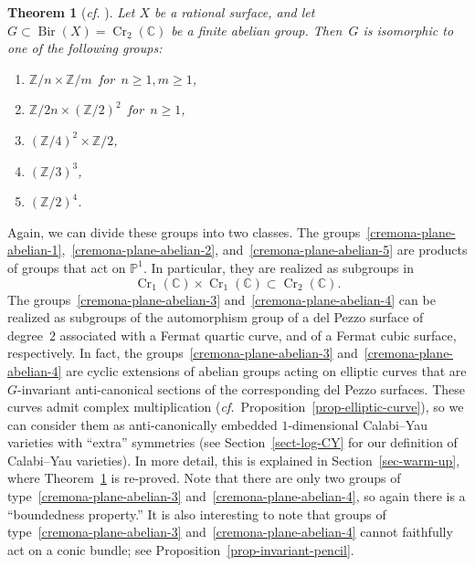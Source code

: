 \documentclass[11pt]{amsart}
\numberwithin{equation}{section}
\newtheorem{thm}{Theorem}[section]
\theoremstyle{definition}
\theoremstyle{remark}
\DeclareMathOperator{\Cr}{Cr}
\DeclareMathOperator{\Bir}{Bir}
\begin{document}
\begin{thm}[\textit{cf.} {\cite{Bl07}}]
\label{thm-surfaces}
Let $X$ be a rational surface, and let $G\subset \Bir(X)=\Cr_2(\mathbb{C})$ be a
finite abelian group. Then~$G$ is isomorphic to one of the following groups:
\begin{enumerate}
\item
\label{cremona-plane-abelian-1}
$\mathbb{Z}/n\times \mathbb{Z}/m$\ for\ $n\geq
1, m\geq 1$,

\item
\label{cremona-plane-abelian-2}
$\mathbb{Z}/2n\times (\mathbb{Z}/2)^2$\ for\ $n\geq 1$,

\item
\label{cremona-plane-abelian-3}
$(\mathbb{Z}/4)^2\times \mathbb{Z}/2$,

\item
\label{cremona-plane-abelian-4}
$(\mathbb{Z}/3)^3$,

\item
\label{cremona-plane-abelian-5}
$(\mathbb{Z}/2)^4$.
\end{enumerate}
\end{thm}

Again, we can divide these groups into two classes. 
The groups~\eqref{cremona-plane-abelian-1},~\eqref{cremona-plane-abelian-2}, and~\eqref{cremona-plane-abelian-5} are products of groups that act on $\mathbb{P}^1$. In particular, they are realized as subgroups in
\[
\Cr_1(\mathbb{C})\times\Cr_1(\mathbb{C})\subset
\Cr_2(\mathbb{C}).
\] 
The groups~\eqref{cremona-plane-abelian-3} and~\eqref{cremona-plane-abelian-4} can be realized as subgroups of the automorphism group of a del Pezzo surface of degree~$2$ associated with a Fermat quartic curve, and of a Fermat cubic surface, respectively. In fact, the groups~\eqref{cremona-plane-abelian-3} and~\eqref{cremona-plane-abelian-4} are cyclic extensions of abelian groups acting on elliptic curves that are $G$-invariant anti-canonical sections of the corresponding del Pezzo surfaces. These curves admit complex multiplication (\textit{cf.}~Proposition~\ref{prop-elliptic-curve}), so we can consider them as anti-canonically embedded $1$-dimensional Calabi--Yau varieties with ``extra'' symmetries (see Section~\ref{sect-log-CY} for our definition of Calabi--Yau varieties). In more detail, this is explained in Section~\ref{sec-warm-up}, where Theorem~\ref{thm-surfaces} is re-proved. Note that there are only two groups of type~\eqref{cremona-plane-abelian-3}
and~\eqref{cremona-plane-abelian-4}, so again there is a ``boundedness property.'' It is also interesting to note that groups of type~\eqref{cremona-plane-abelian-3} and~\eqref{cremona-plane-abelian-4} cannot faithfully act on a conic bundle; see Proposition~\ref{prop-invariant-pencil}.
 
\end{document}
